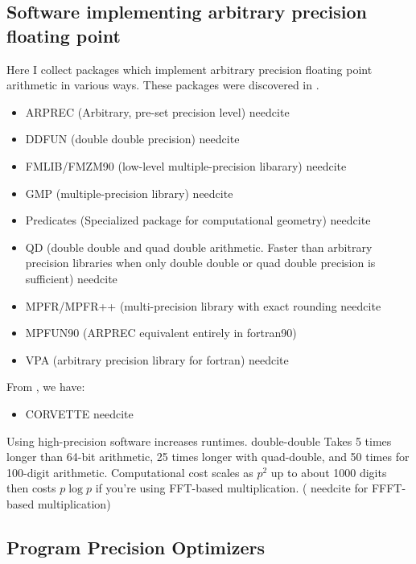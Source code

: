 \documentclass[american]{article}
\newcommand{\needcite}{
	\gls{needcite}
}
\begin{document}
\subsection{Software implementing arbitrary precision floating point} \label{sec:precision-arbitrary}

Here I collect packages which implement arbitrary precision floating point arithmetic in various ways. These packages were discovered in \cite{high-precision-arith-in-science}.

\begin{itemize}
\item ARPREC (Arbitrary, pre-set precision level) \needcite
\item DDFUN (double double precision) \needcite
\item FMLIB/FMZM90 (low-level multiple-precision libarary) \needcite
\item GMP (multiple-precision library) \needcite
\item Predicates (Specialized package for computational geometry) \needcite
\item QD (double double and quad double arithmetic. Faster than arbitrary precision libraries when only double double or quad double precision is sufficient) \needcite
\item MPFR/MPFR++ (multi-precision library with exact rounding \needcite
\item MPFUN90 (ARPREC equivalent entirely in fortran90) \cite{mpfun}
\item VPA (arbitrary precision library for fortran) \needcite
\end{itemize}

From \cite{dhb-zurich-hp}, we have:

\begin{itemize}
\item CORVETTE \needcite
\end{itemize}

Using high-precision software increases runtimes. double-double Takes 5 times longer than 64-bit arithmetic, 25 times longer with quad-double, and 50 times for 100-digit arithmetic. Computational cost scales as $p^2$ up to about 1000 digits then costs $p\log p$ if you're using FFT-based multiplication. \cite{high-precision-arith-in-science} (\needcite for FFFT-based multiplication)

\subsection{Program Precision Optimizers} \label{sec:precision-optimizers}
\end{document}
